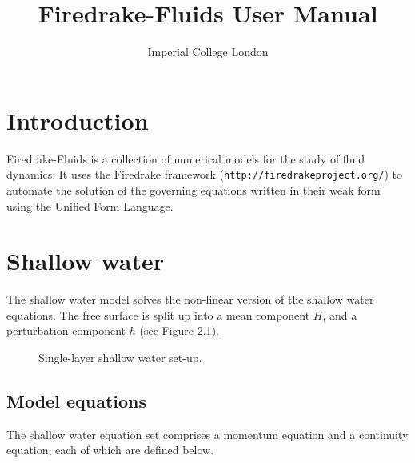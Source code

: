 \documentclass[a4paper,11pt]{report}
\title{Firedrake-Fluids User Manual}
\author{Imperial College London}
\begin{document}
\maketitle
\tableofcontents

\setlength{\parskip}{0.3cm}
\setlength{\parindent}{0cm}

\chapter{Introduction}
Firedrake-Fluids is a collection of numerical models for the study of fluid dynamics. It uses the Firedrake framework (\texttt{http://firedrakeproject.org/}) to automate the solution of the governing equations written in their weak form using the Unified Form Language.

\chapter{Shallow water}
The shallow water model solves the non-linear version of the shallow water equations. The free surface is split up into a mean component $H$, and a perturbation component $h$ (see Figure \ref{fig:shallow_water_setup}).

\begin{figure}
   \centering
      \caption{Single-layer shallow water set-up.}
      \label{fig:shallow_water_setup}
   \end{figure}


\section{Model equations}
The shallow water equation set comprises a momentum equation and a continuity equation, each of which are defined below.
\end{document}
